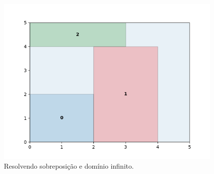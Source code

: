 \begin{figure}[!htb]
    \centering
    \includegraphics[scale=0.5]{utils/images/continuous_example3}
    \caption{Resolvendo sobreposição e domínio infinito.}
    \label{fig:sobreposicao-dominio3}
\end{figure}
